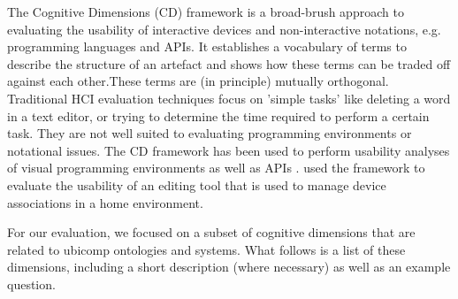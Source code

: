 The Cognitive Dimensions (CD) framework is a broad-brush approach to evaluating the usability of interactive devices and non-interactive notations, e.g. programming languages and APIs. It establishes a vocabulary of terms to describe the structure of an artefact and shows how these terms can be traded off against each other.These terms are (in principle) mutually orthogonal.
Traditional HCI evaluation techniques focus on 'simple tasks' like deleting a word in a text editor, or trying to determine the time required to perform a certain task. They are not well suited to evaluating programming environments or notational issues. The CD framework has been used to perform usability analyses of visual programming environments \cite{Green1996} as well as APIs \cite{Clarke2004}. \cite{Mavrommati2004} used the framework to evaluate the usability of an editing tool that is used to manage device associations in a home environment.

For our evaluation, we focused on a subset of cognitive dimensions that are related to ubicomp ontologies and systems. What follows is a list of these dimensions, including a short description (where necessary) as well as an example question.


